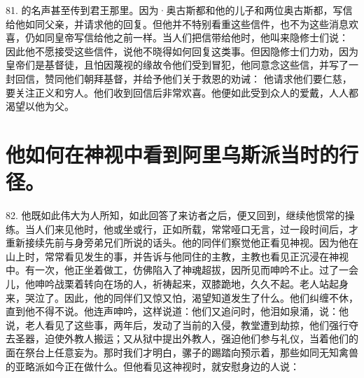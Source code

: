 81. 的名声甚至传到君王那里。因为·奥古斯都和他的儿子和两位奥古斯都，写信给他如同父亲，并请求他的回复。但他并不特别看重这些信件，也不为这些消息欢喜，仍如同皇帝写信给他之前一样。当人们把信带给他时，他叫来隐修士们说： 因此他不愿接受这些信件，说他不晓得如何回复这类事。但因隐修士们力劝，因为皇帝们是基督徒，且怕因蔑视的缘故令他们受到冒犯，他同意念这些信，并写了一封回信，赞同他们朝拜基督，并给予他们关于救恩的劝诫： 他请求他们要仁慈，要关注正义和穷人。他们收到回信后非常欢喜。他便如此受到众人的爱戴，人人都渴望以他为父。\par


\section{他如何在神视中看到阿里乌斯派当时的行径。}

82. 他既如此伟大为人所知，如此回答了来访者之后，便又回到，继续他惯常的操练。当人们来见他时，他或坐或行，正如所载，常常哑口无言，过一段时间后，才重新接续先前与身旁弟兄们所说的话头。他的同伴们察觉他正看见神视。因为他在山上时，常常看见发生的事，并告诉与他同住的主教，主教也看见正沉浸在神视中。有一次，他正坐着做工，仿佛陷入了神魂超拔，因所见而呻吟不止。过了一会儿，他呻吟战栗着转向在场的人，祈祷起来，双膝跪地，久久不起。老人站起身来，哭泣了。因此，他的同伴们又惊又怕，渴望知道发生了什么。他们纠缠不休，直到他不得不说。他连声呻吟，这样说道：他们又追问时，他泪如泉涌，说：他说，老人看见了这些事，两年后，发动了当前的入侵，教堂遭到劫掠，他们强行夺去圣器，迫使外教人搬运；又从狱中提出外教人，强迫他们参与礼仪，当着他们的面在祭台上任意妄为。那时我们才明白，骡子的踢踏向预示着，那些如同无知禽兽的亚略派如今正在做什么。但他看见这神视时，就安慰身边的人说：\par

